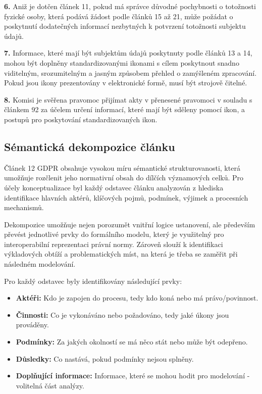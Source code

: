 \begin{displayquote}
\vspace{0.5em}
\textbf{6.} Aniž je dotčen článek 11, pokud má správce důvodné pochybnosti o totožnosti fyzické osoby, která podává žádost podle článků 15 až 21, může požádat o poskytnutí dodatečných informací nezbytných k potvrzení totožnosti subjektu údajů.

\vspace{0.5em}
\textbf{7.} Informace, které mají být subjektům údajů poskytnuty podle článků 13 a 14, mohou být doplněny standardizovanými ikonami s cílem poskytnout snadno viditelným, srozumitelným a jasným způsobem přehled o zamýšleném zpracování. Pokud jsou ikony prezentovány v elektronické formě, musí být strojově čitelné.

\vspace{0.5em}
\textbf{8.} Komisi je svěřena pravomoc přijímat akty v přenesené pravomoci v souladu s článkem 92 za účelem určení informací, které mají být sděleny pomocí ikon, a postupů pro poskytování standardizovaných ikon.
\end{displayquote}


\subsection{Sémantická dekompozice článku}
\label{sec:semanticka-dekompozice-clanku}
Článek 12 GDPR obsahuje vysokou míru sémantické strukturovanosti, která umožňuje rozčlenit jeho normativní obsah do dílčích významových celků. Pro účely konceptualizace byl každý odstavec článku analyzován z hlediska identifikace hlavních aktérů, klíčových pojmů, podmínek, výjimek a procesních mechanismů.

Dekompozice umožňuje nejen porozumět vnitřní logice ustanovení, ale především převést jednotlivé prvky do formálního modelu, který je využitelný pro interoperabilní reprezentaci právní normy. Zároveň slouží k identifikaci výkladových obtíží a problematických míst, na která je třeba se zaměřit při následném modelování.

Pro každý odstavec byly identifikovány následující prvky:
\begin{itemize}
  \item \textbf{Aktéři:} Kdo je zapojen do procesu, tedy kdo koná nebo má právo/povinnost.
  \item \textbf{Činnosti:} Co je vykonáváno nebo požadováno, tedy jaké úkony jsou prováděny.
  \item \textbf{Podmínky:} Za jakých okolností se má něco stát nebo může být odepřeno.
  \item \textbf{Důsledky:} Co nastává, pokud podmínky nejsou splněny.
  \item \textbf{Doplňující informace:} Informace, které se mohou hodit pro modelování - volitelná část analýzy.
\end{itemize}

